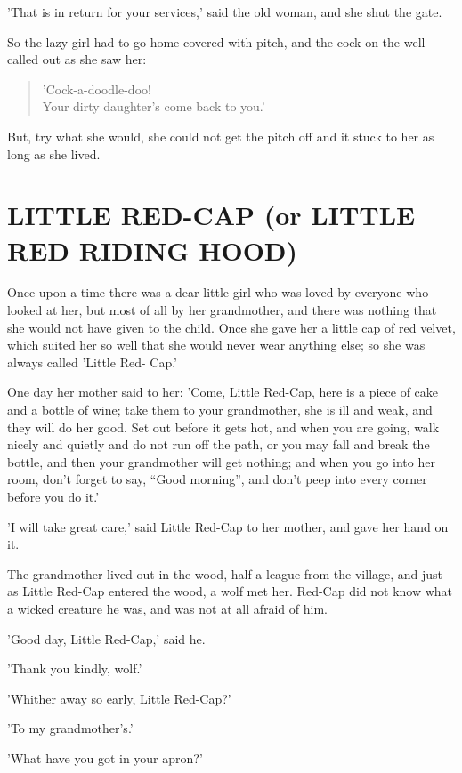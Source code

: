 \documentclass[12pt]{book}
\begin{document}
'That is in return for your services,' said the old woman, and she
shut the gate.

So the lazy girl had to go home covered with pitch, and the cock on
the well called out as she saw her:

\begin{verse}
 'Cock-a-doodle-doo!\\
  Your dirty daughter's come back to you.'
\end{verse}

But, try what she would, she could not get the pitch off and it stuck
to her as long as she lived.



\chapter[LITTLE RED-CAP (or LITTLE RED RIDING\ldots]{LITTLE RED-CAP (or LITTLE RED RIDING HOOD)}

Once upon a time there was a dear little girl who was loved by
everyone who looked at her, but most of all by her grandmother, and
there was nothing that she would not have given to the child. Once she
gave her a little cap of red velvet, which suited her so well that she
would never wear anything else; so she was always called 'Little Red-
Cap.'

One day her mother said to her: 'Come, Little Red-Cap, here is a piece
of cake and a bottle of wine; take them to your grandmother, she is
ill and weak, and they will do her good. Set out before it gets hot,
and when you are going, walk nicely and quietly and do not run off the
path, or you may fall and break the bottle, and then your grandmother
will get nothing; and when you go into her room, don't forget to say,
``Good morning'', and don't peep into every corner before you do it.'

'I will take great care,' said Little Red-Cap to her mother, and gave
her hand on it.

The grandmother lived out in the wood, half a league from the village,
and just as Little Red-Cap entered the wood, a wolf met her. Red-Cap
did not know what a wicked creature he was, and was not at all afraid
of him.

'Good day, Little Red-Cap,' said he.

'Thank you kindly, wolf.'

'Whither away so early, Little Red-Cap?'

'To my grandmother's.'

'What have you got in your apron?'
\end{document}
